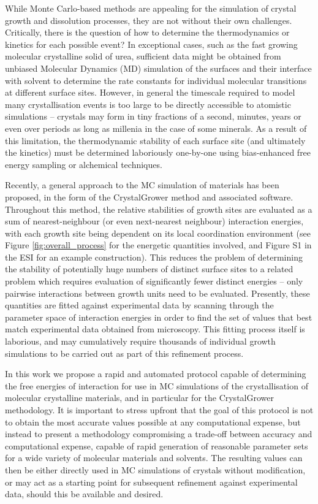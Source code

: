 \documentclass[twoside,twocolumn,9pt]{article}
\begin{document}
While Monte Carlo-based methods are appealing for the simulation of crystal growth and dissolution processes, they are not without their own challenges. Critically, there is the question of how to determine the thermodynamics or kinetics for each possible event? In exceptional cases, such as the fast growing molecular crystalline solid of urea, sufficient data might be obtained from unbiased Molecular Dynamics (MD) simulation of the surfaces and their interface with solvent to determine the rate constants for individual molecular transitions at different surface sites.\cite{Piana2005Nature,Piana2005JACS} 
However, in general the timescale required to model many crystallisation events is too large to be directly accessible to atomistic simulations -- crystals may form in tiny fractions of a second, minutes, years or even over periods as long as millenia in the case of some minerals. As a result of this limitation, the thermodynamic stability of each surface site (and ultimately the kinetics) must be determined laboriously one-by-one using bias-enhanced free energy sampling or alchemical techniques.\cite{Stack2012,Silvestri2022} 

Recently, a general approach to the MC simulation of materials has been proposed, in the form of the CrystalGrower\cite{Hill2021,Anderson2017} method and associated software. Throughout this method, the relative stabilities of growth sites are evaluated as a sum of nearest-neighbour (or even next-nearest neighbour) interaction energies, with each growth site being dependent on its local coordination environment (see Figure \ref{fig:overall_process} for the energetic quantities involved, and Figure S1 in the ESI for an example construction).
This reduces the problem of determining the stability of potentially huge numbers of distinct surface sites to a related problem which requires evaluation of significantly fewer distinct energies -- only pairwise interactions between growth units need to be evaluated. 
Presently, these quantities are fitted against experimental data by scanning through the parameter space of interaction energies in order to find the set of values that best match experimental data obtained from microscopy. This fitting process itself is laborious, and may cumulatively require thousands of individual growth simulations to be carried out as part of this refinement process.

In this work we propose a rapid and automated protocol capable of determining the free energies of interaction for use in MC simulations of the crystallisation of molecular crystalline materials, and in particular for the CrystalGrower methodology. It is important to stress upfront that the goal of this protocol is not to obtain the most accurate values possible at any computational expense, but instead to present a methodology compromising a trade-off between accuracy and computational expense, capable of rapid generation of reasonable parameter sets for a wide variety of molecular materials and solvents. 
The resulting values can then be either directly used in MC simulations of crystals without modification, or may act as a starting point for subsequent refinement against experimental data, should this be available and desired. 
\end{document}
